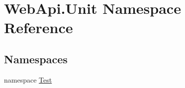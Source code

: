 \hypertarget{namespace_web_api_1_1_unit}{}\section{Web\+Api.\+Unit Namespace Reference}
\label{namespace_web_api_1_1_unit}
\subsection*{Namespaces}
\begin{DoxyCompactItemize}
\item 
namespace \mbox{\hyperlink{namespace_web_api_1_1_unit_1_1_test}{Test}}
\end{DoxyCompactItemize}
